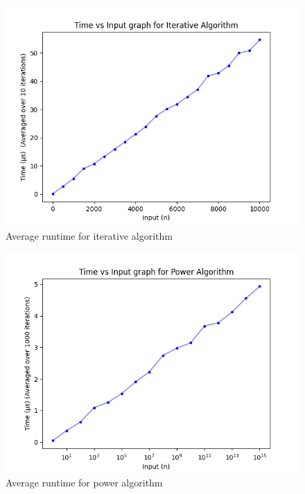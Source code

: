 \documentclass[10pt, a4paper]{article}
\begin{document}
\begin{figure}[h]
    \centering
    \includegraphics[width=15cm]{Iterative_Plot.png}
    \caption{Average runtime for iterative algorithm}
    \label{fig:m}
\end{figure}

\begin{figure}[h]
    \centering
    \includegraphics[width=15cm]{Power_Plot.png}
    \caption{Average runtime for power algorithm}
    \label{fig:m}
\end{figure}
\end{document}
